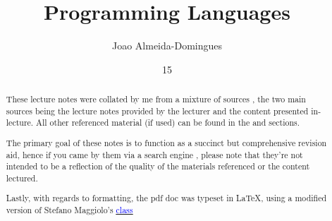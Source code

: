 \documentclass[english,course]{Notes}
\title{Programming Languages}
\author{Joao Almeida-Domingues}
\date{15}{01}{2021}
\begin{document}

\begin{abstract}
	\par{These lecture notes were collated by me from a mixture of sources , the two main sources being the lecture notes provided by the lecturer and the 
content presented in-lecture. All other referenced material (if used) can be found in the  and  sections.}
	\par{The primary goal of these notes is to function as a succinct but comprehensive revision aid, hence if you came by them via a search engine , please note 
that they're not intended to be a reflection of the quality of the materials referenced or the content lectured.}
	\par{Lastly, with regards to formatting, the pdf doc was typeset in \LaTeX , using a modified version of Stefano Maggiolo's \href{http://blog.poormansmath.net/
latex-class-for-lecture-notes/}{\underline{\textcolor{blue}{class}}}}
\end{abstract}
\newpage





\newpage
\nocite{*}
\printbibliography

\end{document}
